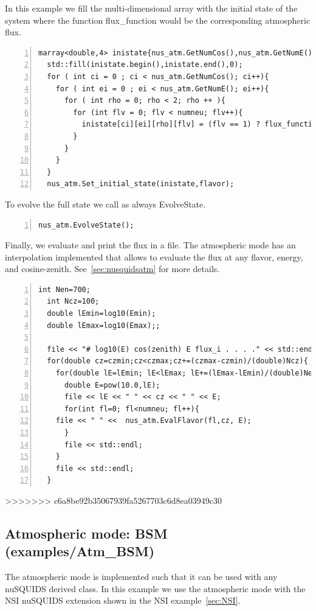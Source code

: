 \documentclass[3p,12pt]{elsarticle}
\newcommand{\ttf}{\ttfamily}
\begin{document}
In this example we fill the multi-dimensional array with the initial state of the
system where the function {\ttf flux\_function} would be the corresponding
atmospheric flux.

\begin{lstlisting}[frame=leftline, numbers =
  left,breaklines=true,label = ex:sin1,firstnumber=last]
  marray<double,4> inistate{nus_atm.GetNumCos(),nus_atm.GetNumE(),2,numneu};
  std::fill(inistate.begin(),inistate.end(),0);
  for ( int ci = 0 ; ci < nus_atm.GetNumCos(); ci++){
    for ( int ei = 0 ; ei < nus_atm.GetNumE(); ei++){
      for ( int rho = 0; rho < 2; rho ++ ){
        for (int flv = 0; flv < numneu; flv++){
          inistate[ci][ei][rho][flv] = (flv == 1) ? flux_function(e_range[ei], cz_range[ci]) : 0.0;//set 1 only to the muon flavor
        }
      }
    }
  }
  nus_atm.Set_initial_state(inistate,flavor);
\end{lstlisting}

To evolve the full state we call as always {\ttf EvolveState}. 

\begin{lstlisting}[frame=leftline, numbers =
  left,breaklines=true,label = ex:sin1,firstnumber=last]
nus_atm.EvolveState();
\end{lstlisting}

Finally, we evaluate and print the flux in a file. The
atmospheric mode has an interpolation implemented that allows to
evaluate the flux at any flavor, energy, and cosine-zenith. See~\ref{sec:nusquidsatm}
for more details.

\begin{lstlisting}[frame=leftline, numbers =
  left,breaklines=true,label = ex:sin1,firstnumber=last]
  int Nen=700;
  int Ncz=100;
  double lEmin=log10(Emin);
  double lEmax=log10(Emax);;

  file << "# log10(E) cos(zenith) E flux_i . . . ." << std::endl;
  for(double cz=czmin;cz<czmax;cz+=(czmax-czmin)/(double)Ncz){
    for(double lE=lEmin; lE<lEmax; lE+=(lEmax-lEmin)/(double)Nen){
      double E=pow(10.0,lE);
      file << lE << " " << cz << " " << E;
      for(int fl=0; fl<numneu; fl++){
	file << " " <<  nus_atm.EvalFlavor(fl,cz, E);
      }
      file << std::endl;
    }
    file << std::endl;
  }
\end{lstlisting}


>>>>>>> c6a8be92b35067939fa5267703c6d8ea03949c30
\subsection{Atmospheric mode: BSM \textnormal{({\ttf examples/Atm\_BSM})}}
\label{sec:atmBSM}
The atmospheric mode is implemented such  that it can be used with any
nuSQUIDS derived class. In this example we use the atmospheric mode
with the NSI nuSQUIDS extension shown in the NSI example~\ref{sec:NSI}.
\end{document}
